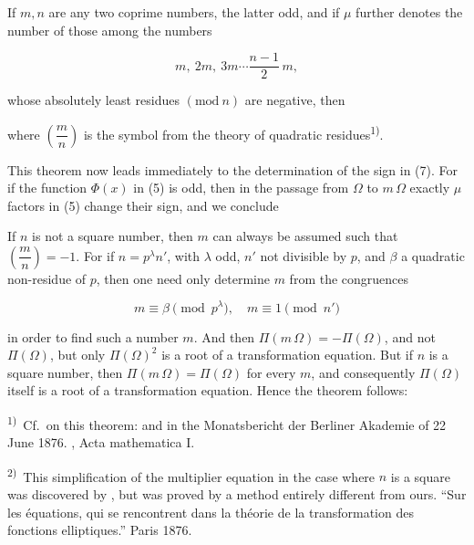 If $m, n$ are any two coprime numbers, the latter odd, and if $\mu$ further denotes the number of those among the numbers

\[
m,\ 2m,\ 3m \cdots \frac{n-1}{2}\,m,
\]

whose absolutely least residues $(\mathrm{mod}\ n)$ are negative, then


where $\left(\dfrac{m}{n}\right)$ is the  symbol from the theory of quadratic residues\textsuperscript{1)}.

This theorem now leads immediately to the determination of the sign in (7). For if the function $\Phi(x)$ in (5) is odd, then in the passage from $\Omega$ to $m\,\Omega$ exactly $\mu$ factors in (5) change their sign, and we conclude


If $n$ is not a square number, then $m$ can always be assumed such that $\left(\dfrac{m}{n}\right) = -1$. For if $n = p^\lambda n'$, with $\lambda$ odd, $n'$ not divisible by $p$, and $\beta$ a quadratic non-residue of $p$, then one need only determine $m$ from the congruences

\[
m \equiv \beta \pmod{p^\lambda}, \quad m \equiv 1 \pmod{n'}
\]

in order to find such a number $m$. And then $\Pi(m\,\Omega) = -\Pi(\Omega)$, and not $\Pi(\Omega)$, but only $\Pi(\Omega)^2$ is a root of a transformation equation. But if $n$ is a square number, then $\Pi(m\,\Omega) = \Pi(\Omega)$ for every $m$, and consequently $\Pi(\Omega)$ itself is a root of a transformation equation. Hence the theorem follows:

\begin{quote}
\end{quote}

\textsuperscript{1)}~Cf.\ on this theorem:  and  in the Monatsbericht der Berliner Akademie of 22 June 1876. , Acta mathematica I.

\textsuperscript{2)}~This simplification of the multiplier equation in the case where $n$ is a square was discovered by , but was proved by a method entirely different from ours. ``Sur les équations, qui se rencontrent dans la théorie de la transformation des fonctions elliptiques.'' Paris 1876.
